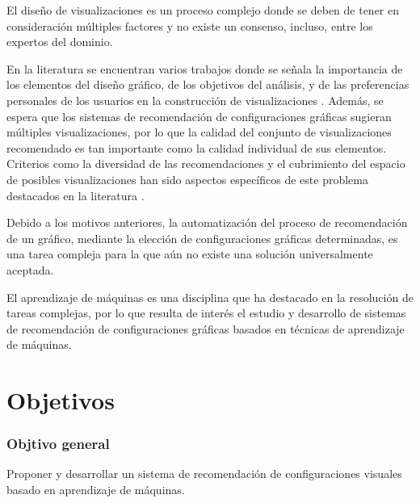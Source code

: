El dise\~no de visualizaciones es un proceso complejo 
donde se deben de tener en consideraci\'on m\'ultiples factores y no existe un
consenso, incluso, entre los expertos del dominio.

En la literatura se encuentran varios trabajos donde se se\~nala la importancia
de los elementos del dise\~no gr\'afico,
de los objetivos del an\'alisis, y de las
preferencias personales de los usuarios en la construcci\'on de visualizaciones \cite{zeng2021we}. Adem\'as,
se espera que los sistemas de recomendaci\'on de configuraciones
gr\'aficas sugieran m\'ultiples visualizaciones, por lo que
la calidad del conjunto de visualizaciones recomendado es tan
importante como la calidad individual de sus elementos. Criterios
como la diversidad de las recomendaciones y el cubrimiento
del espacio de posibles visualizaciones han sido aspectos
espec\'ificos de este problema destacados en la literatura \cite{hu2019vizml}.


Debido a los motivos anteriores, la automatizaci\'on del proceso de recomendaci\'on de un gr\'afico, mediante
la elecci\'on de configuraciones gr\'aficas determinadas, es una tarea compleja para
la que a\'un no existe una soluci\'on universalmente aceptada.

El aprendizaje de m\'aquinas es una disciplina que ha destacado en la
resoluci\'on de tareas complejas, por lo que resulta de inter\'es
el estudio y desarrollo de sistemas de recomendaci\'on de configuraciones
gr\'aficas basados en t\'ecnicas de aprendizaje de m\'aquinas.


\section*{Objetivos}

\subsubsection{Objtivo general}
Proponer y desarrollar un sistema de recomendaci\'on de configuraciones
visuales basado en aprendizaje de m\'aquinas.

